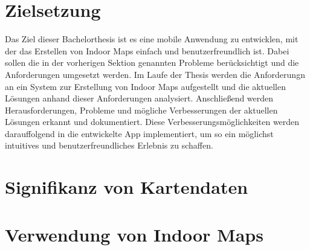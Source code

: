 \section{Zielsetzung}
Das Ziel dieser Bachelorthesis ist es eine mobile Anwendung zu entwicklen, mit der das Erstellen von Indoor Maps einfach und benutzerfreundlich ist. Dabei sollen die in der vorherigen Sektion genannten Probleme berücksichtigt und die Anforderungen umgesetzt werden. Im Laufe der Thesis werden die Anforderungn an ein System zur Erstellung von Indoor Maps aufgestellt und die aktuellen Lösungen anhand dieser Anforderungen analysiert. Anschließend werden Herausforderungen, Probleme und mögliche Verbesserungen der aktuellen Lösungen erkannt und dokumentiert. Diese Verbesserungsmöglichkeiten werden darauffolgend in die entwickelte App implementiert, um so ein möglichst intuitives und benutzerfreundliches Erlebnis zu schaffen.%
%
\section{Signifikanz von Kartendaten}
%
\section{Verwendung von Indoor Maps}
